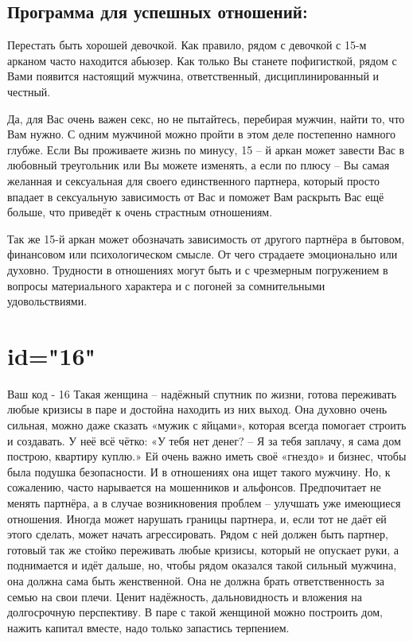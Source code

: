 \subsection{Программа для успешных отношений:}
\item Перестать быть хорошей девочкой. Как правило, рядом с девочкой 
с 15-м арканом часто находится абьюзер. Как только Вы станете 
пофигисткой, рядом с Вами появится настоящий мужчина, ответственный, 
дисциплинированный и честный.
\item Да, для Вас очень важен секс, но не пытайтесь, перебирая 
мужчин, найти то, что Вам нужно. С одним мужчиной можно пройти в 
этом деле постепенно намного глубже. Если Вы проживаете жизнь по 
минусу, 15 – й аркан может завести Вас в любовный треугольник или 
Вы можете изменять, а если по плюсу – Вы самая желанная и сексуальная 
для своего единственного партнера, который просто впадает в сексуальную 
зависимость от Вас и поможет Вам раскрыть Вас ещё больше, что приведёт 
к очень страстным отношениям.
\item Так же 15-й аркан может обозначать зависимость от другого 
партнёра в бытовом, финансовом или психологическом смысле. От чего 
страдаете эмоционально или духовно. Трудности в отношениях могут быть 
и с чрезмерным погружением в вопросы материального характера и с 
погоней за сомнительными удовольствиями.
\endsubsection
\endsection

\section{id="16"}{Ваш код - 16}
Такая женщина – надёжный спутник по жизни, готова переживать любые 
кризисы в паре и достойна находить из них выход. Она духовно очень 
сильная, можно даже сказать «мужик с яйцами», которая всегда помогает 
строить и создавать. У неё всё чётко: «У тебя нет денег? – Я за тебя 
заплачу, я сама дом построю, квартиру куплю.» Ей очень важно иметь 
своё «гнездо» и бизнес, чтобы была подушка безопасности. И в отношениях 
она ищет такого мужчину. Но, к сожалению, часто нарывается на 
мошенников и альфонсов. Предпочитает не менять партнёра, а в случае 
возникновения проблем – улучшать уже имеющиеся отношения. Иногда 
может нарушать границы партнера, и, если тот не даёт ей этого сделать, 
может начать агрессировать. Рядом с ней должен быть партнер, готовый 
так же стойко переживать любые кризисы, который не опускает руки, а 
поднимается и идёт дальше, но, чтобы рядом оказался такой сильный 
мужчина, она должна сама быть женственной. Она не должна брать 
ответственность за семью на свои плечи. Ценит надёжность, дальновидность 
и вложения на долгосрочную перспективу. В паре с такой женщиной можно 
построить дом, нажить капитал вместе, надо только запастись терпением.
